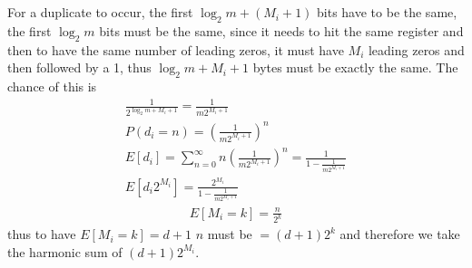 \\\\
For a duplicate to occur, the first $\log_2 m+(M_i+1)$ bits have to be the same, the first $\log_2 m$ bits must be the same, since it needs to hit the same register and then to have the same number of leading zeros, it must have $M_i$ leading zeros and then followed by a 1, thus $\log_2m+M_i+1$ bytes must be exactly the same. The chance of this is 
\begin{equation*}
    \begin{split}
        \frac{1}{2^{\log_2 m+M_i+1}}=\frac{1}{m 2^{M_i +1}}\\
        P(d_i=n)=\left(\frac{1}{m 2^{M_i +1}}\right)^n\\
        E[d_i]=\sum_{n=0}^\infty n\left(\frac{1}{m 2^{M_i +1}}\right)^n=\frac{1}{1-\frac{1}{m2^{M_i+1}}}\\
        E[d_i2^{M_i}]=\frac{2^{M_i}}{1-\frac{1}{m2^{M_i+1}}}
    \end{split}
\end{equation*}
\begin{equation*}
    \begin{split}
        E[M_i=k]=\frac{n}{2^k}
    \end{split}
\end{equation*}
thus to have $E[M_i=k]=d+1$ $n$ must be $=(d+1)2^{k}$ and therefore we take the harmonic sum of $(d+1)2^{M_i}$. 
